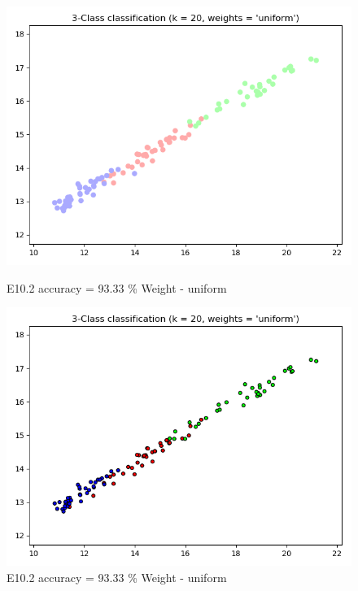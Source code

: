 \documentclass{classrep}
\begin{document}
\begin{figure}[H]
\begin{minipage}{0.5\linewidth}
				\includegraphics[scale=0.25]{KNN_seed_10_5.png}
				\caption{E10.2 accuracy = 93.33 \% Weight - uniform}
				\label{E10.2}
			\end{minipage}
			\begin{minipage}{0.5\linewidth}
				\centering
				\includegraphics[scale=0.25]{KNN_seed_10_6.png}
				\caption{E10.2 accuracy = 93.33 \% Weight - uniform}
				\label{E10.2}
			\end{minipage}
			\begin{minipage}{0.5\linewidth}
				\centering

\end{minipage}
\end{figure}
\end{document}
